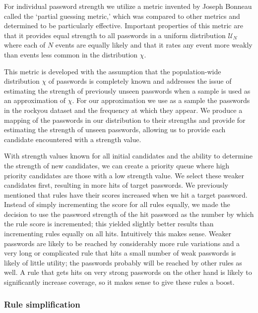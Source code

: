 \documentclass[letterpaper,twocolumn,10pt]{article}
\begin{document}
For individual password strength we utilize a metric invented by Joseph Bonneau
called the `partial guessing metric,'\cite{bonneau2012statistical} which was
compared to other metrics and determined to be particularly effective.
Important properties of this metric are that it provides equal strength to all
passwords in a uniform distribution $\mathcal{U}_{N}$ %
where each of $N$ events are equally likely and that it rates any event more
weakly than events less common in the distribution $\chi$.

This metric is developed with the assumption that the population-wide
distribution $\chi$ of passwords is completely known and addresses the issue of
estimating the strength of previously unseen passwords when a sample is used as
an approximation of $\chi$. For our approximation we use as a sample the
passwords in the rockyou dataset and the frequency at which they appear. We
produce a mapping of the passwords in our distribution to their strengths and
provide for estimating the strength of unseen passwords, allowing us to provide
each candidate encountered with a strength value.

With strength values known for all initial candidates and the ability to
determine the strength of new candidates, we can create a priority queue where
high priority candidates are those with a low strength value. We select these
weaker candidates first, resulting in more hits of target passwords. We
previously mentioned that rules have their scores increased when we hit a target
password. Instead of simply incrementing the score for all rules equally, we
made the decision to use the password strength of the hit password as the
number by which the rule score is incremented; this yielded slightly better
results than incrementing rules equally on all hits. Intuitively this makes
sense. Weaker passwords are likely to be reached by considerably more rule
variations and a very long or complicated rule that hits a small number of
weak passwords is likely of little utility; the passwords probably will be
reached by other rules as well. A rule that gets hits on very strong passwords
on the other hand is likely to significantly increase coverage, so it makes
sense to give these rules a boost.



\subsubsection{Rule simplification}
\end{document}
